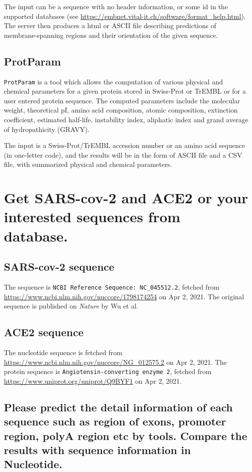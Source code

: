 \documentclass[en,black,10pt,normal]{elegantnote}
\newcommand{\upcite}[1]{\textsuperscript{\textsuperscript{\cite{#1}}}}
\begin{document}
The input can be a sequence with no header information, or some id in the supported databases (see \url{https://embnet.vital-it.ch/software/format_help.html}).
The server then produces a html or ASCII file describing predictions of membrane-spanning regions and their orientation of the given sequence.


\subsection{ProtParam}
\texttt{ProtParam} is a tool which allows the computation of various physical and chemical parameters 
for a given protein stored in Swiss-Prot or TrEMBL or for a user entered protein sequence. 
The computed parameters include the molecular weight, theoretical pI, 
amino acid composition, atomic composition, extinction coefficient, estimated half-life, 
instability index, aliphatic index and grand average of hydropathicity (GRAVY).\upcite{gasteiger2005protein}

The input is a Swiss-Prot/TrEMBL accession number or an amino acid sequence (in one-letter code),
and the results will be in the form of ASCII file and a CSV file, with summarized physical and chemical parameters.

\section{Get SARS-cov-2 and ACE2 or your interested sequences from database.}
\subsection{SARS-cov-2 sequence}
The sequence is \texttt{NCBI Reference Sequence: NC\_045512.2}, fetched from \url{https://www.ncbi.nlm.nih.gov/nuccore/1798174254} on Apr 2, 2021.
The original sequence is published on \textit{Nature} by Wu et al.\upcite{wu2020new}
\subsection{ACE2 sequence}
The nucleotide sequence is fetched from \url{https://www.ncbi.nlm.nih.gov/nuccore/NG_012575.2} on Apr 2, 2021.
The protein sequence is \texttt{Angiotensin-converting enzyme 2}, fetched from \url{https://www.uniprot.org/uniprot/Q9BYF1} on Apr 2, 2021.

\subsection{Please predict the detail information of each sequence such as region of exons, promoter region, polyA region etc by tools. Compare the results with sequence information in Nucleotide.}
\end{document}
